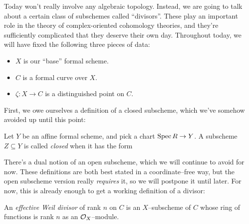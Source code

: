 Today won't really involve any algebraic topology.  Instead, we are going to talk about a certain class of subschemes called ``divisors''.  These play an important role in the theory of complex-oriented cohomology theories, and they're sufficiently complicated that they deserve their own day.  Throughout today, we will have fixed the following three pieces of data:
\begin{itemize}
\item $X$ is our ``base'' formal scheme.
\item $C$ is a formal curve over $X$.
\item $\zeta: X \to C$ is a distinguished point on $C$.
\end{itemize}

First, we owe ourselves a definition of a closed subscheme, which we've somehow avoided up until this point:
\begin{definition}
Let $Y$ be an affine formal scheme, and pick a chart $\operatorname{Spec} R \to Y$.  A subscheme $Z \subseteq Y$ is called \textit{closed} when it has the form
\begin{center}
\end{center}
\end{definition}

There's a dual notion of an open subscheme, which we will continue to avoid for now.  These definitions are both best stated in a coordinate--free way, but the open subscheme version really \emph{requires} it, so we will postpone it until later.  For now, this is already enough to get a working definition of a divisor:

\begin{definition}
An \textit{effective Weil divisor} of rank $n$ on $C$ is an $X$--subscheme of $C$ whose ring of functions is rank $n$ as an $\mathcal{O}_X$--module.
\end{definition}

